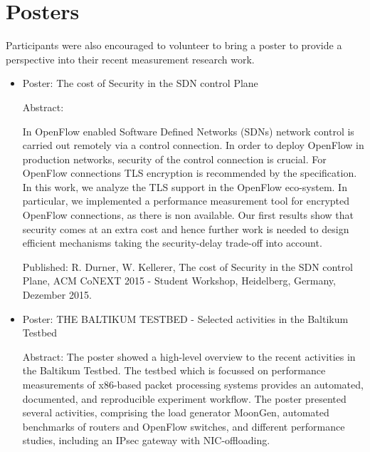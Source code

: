 \section{Posters}\label{sec:posters}

Participants were also encouraged to volunteer to bring a poster to provide a
perspective into their recent measurement research work.

\begin{itemize}

\item Poster: The cost of Security in the SDN control Plane

Abstract: 

In OpenFlow enabled Software Defined Networks (SDNs) network control is carried out remotely via a control connection. In order to deploy OpenFlow in production networks, security of the control connection is crucial. For OpenFlow connections TLS encryption is recommended by the specification. In this work, we analyze the TLS support in the OpenFlow eco-system. In particular, we implemented a performance measurement tool for encrypted OpenFlow connections, as there is non available.  Our first results show that security comes at an extra cost and hence further work is needed to design efficient mechanisms taking the security-delay trade-off into account.

Published: R. Durner, W. Kellerer, The cost of Security in the SDN control Plane, ACM CoNEXT 2015 - Student Workshop, Heidelberg, Germany, Dezember 2015.


\item Poster: THE BALTIKUM TESTBED - Selected activities in the Baltikum Testbed

Abstract: The poster showed a high-level overview to the recent activities in the
Baltikum Testbed. The testbed which is focussed on performance
measurements of x86-based packet processing systems provides an
automated, documented, and reproducible experiment workflow. The poster
presented several activities, comprising the load generator MoonGen,
automated benchmarks of routers and OpenFlow switches, and different
performance studies, including an IPsec gateway with NIC-offloading.


\end{itemize}

